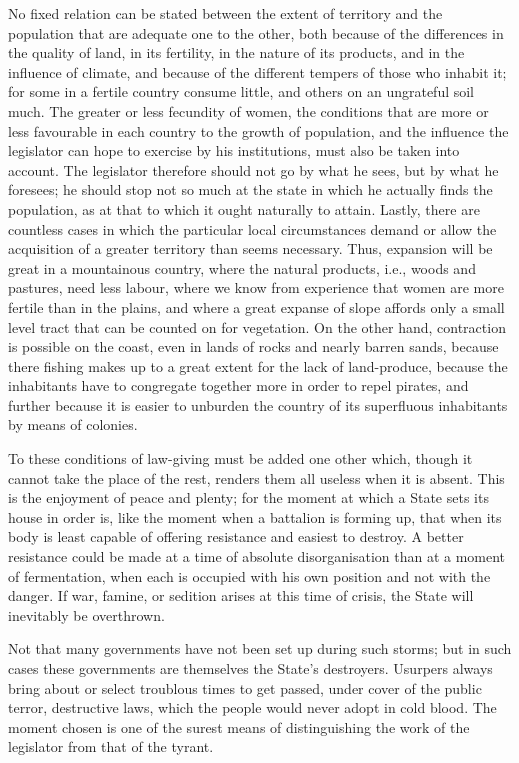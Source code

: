 \documentclass[12pt]{report}
\begin{document}
No fixed relation can be stated between the extent of territory and the population that are adequate one to the other, both because of the differences in the quality of land, in its fertility, in the nature of its products, and in the influence of climate, and because of the different tempers of those who inhabit it; for some in a fertile country consume little, and others on an ungrateful soil much. The greater or less fecundity of women, the conditions that are more or less favourable in each country to the growth of population, and the influence the legislator can hope to exercise by his institutions, must also be taken into account. The legislator therefore should not go by what he sees, but by what he foresees; he should stop not so much at the state in which he actually finds the population, as at that to which it ought naturally to attain. Lastly, there are countless cases in which the particular local circumstances demand or allow the acquisition of a greater territory than seems necessary. Thus, expansion will be great in a mountainous country, where the natural products, i.e., woods and pastures, need less labour, where we know from experience that women are more fertile than in the plains, and where a great expanse of slope affords only a small level tract that can be counted on for vegetation. On the other hand, contraction is possible on the coast, even in lands of rocks and nearly barren sands, because there fishing makes up to a great extent for the lack of land-produce, because the inhabitants have to congregate together more in order to repel pirates, and further because it is easier to unburden the country of its superfluous inhabitants by means of colonies.

To these conditions of law-giving must be added one other which, though it cannot take the place of the rest, renders them all useless when it is absent. This is the enjoyment of peace and plenty; for the moment at which a State sets its house in order is, like the moment when a battalion is forming up, that when its body is least capable of offering resistance and easiest to destroy. A better resistance could be made at a time of absolute disorganisation than at a moment of fermentation, when each is occupied with his own position and not with the danger. If war, famine, or sedition arises at this time of crisis, the State will inevitably be overthrown.

Not that many governments have not been set up during such storms; but in such cases these governments are themselves the State's destroyers. Usurpers always bring about or select troublous times to get passed, under cover of the public terror, destructive laws, which the people would never adopt in cold blood. The moment chosen is one of the surest means of distinguishing the work of the legislator from that of the tyrant.
\end{document}
